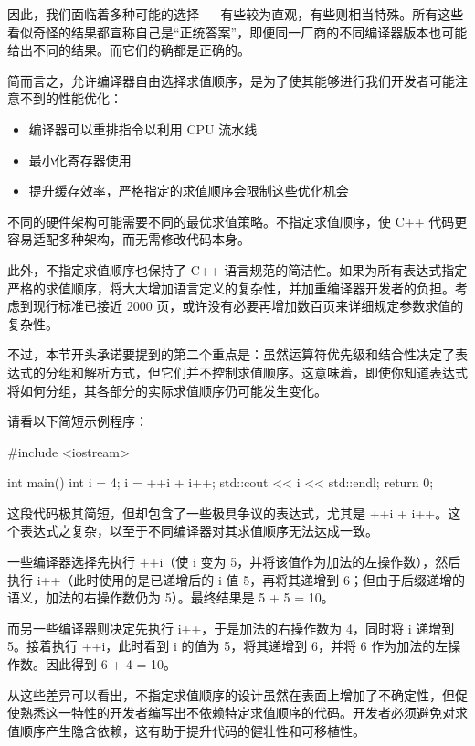 因此，我们面临着多种可能的选择 --- 有些较为直观，有些则相当特殊。所有这些看似奇怪的结果都宣称自己是“正统答案”，即便同一厂商的不同编译器版本也可能给出不同的结果。而它们的确都是正确的。

简而言之，允许编译器自由选择求值顺序，是为了使其能够进行我们开发者可能注意不到的性能优化：

\begin{itemize}
\item 
编译器可以重排指令以利用 CPU 流水线

\item 
最小化寄存器使用

\item 
提升缓存效率，严格指定的求值顺序会限制这些优化机会
\end{itemize}

不同的硬件架构可能需要不同的最优求值策略。不指定求值顺序，使 C++ 代码更容易适配多种架构，而无需修改代码本身。

此外，不指定求值顺序也保持了 C++ 语言规范的简洁性。如果为所有表达式指定严格的求值顺序，将大大增加语言定义的复杂性，并加重编译器开发者的负担。考虑到现行标准已接近 2000 页，或许没有必要再增加数百页来详细规定参数求值的复杂性。

不过，本节开头承诺要提到的第二个重点是：虽然运算符优先级和结合性决定了表达式的分组和解析方式，但它们并不控制求值顺序。这意味着，即使你知道表达式将如何分组，其各部分的实际求值顺序仍可能发生变化。

请看以下简短示例程序：

\begin{cpp}
#include <iostream>

int main() {
  int i = 4;
  i = ++i + i++;
  std::cout << i << std::endl;
  return 0;
}
\end{cpp}

这段代码极其简短，但却包含了一些极具争议的表达式，尤其是 ++i + i++。这个表达式之复杂，以至于不同编译器对其求值顺序无法达成一致。

一些编译器选择先执行 ++i（使 i 变为 5，并将该值作为加法的左操作数），然后执行 i++（此时使用的是已递增后的 i 值 5，再将其递增到 6；但由于后缀递增的语义，加法的右操作数仍为 5）。最终结果是 5 + 5 = 10。

而另一些编译器则决定先执行 i++，于是加法的右操作数为 4，同时将 i 递增到 5。接着执行 ++i，此时看到 i 的值为 5，将其递增到 6，并将 6 作为加法的左操作数。因此得到 6 + 4 = 10。

从这些差异可以看出，不指定求值顺序的设计虽然在表面上增加了不确定性，但促使熟悉这一特性的开发者编写出不依赖特定求值顺序的代码。开发者必须避免对求值顺序产生隐含依赖，这有助于提升代码的健壮性和可移植性。

